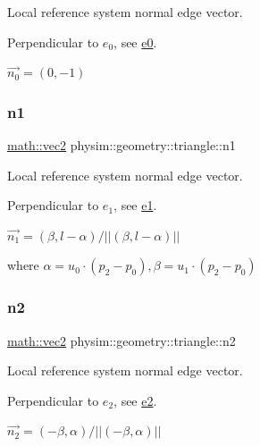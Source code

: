 Local reference system normal edge vector. 

Perpendicular to $e_0$, see \hyperlink{classphysim_1_1geometry_1_1triangle_a848982c72944fee96e266cae874b0553}{e0}.

$\vec{n_0} = (0,-1)$ \mbox{\label{classphysim_1_1geometry_1_1triangle_abebf947c1772ae8b3932a2c3e84597c6}} 
\subsubsection{\texorpdfstring{n1}{n1}}
{\footnotesize\ttfamily \hyperlink{structphysim_1_1math_1_1vec2}{math\+::vec2} physim\+::geometry\+::triangle\+::n1\hspace{0.3cm}{\ttfamily [private]}}



Local reference system normal edge vector. 

Perpendicular to $e_1$, see \hyperlink{classphysim_1_1geometry_1_1triangle_a1c94f05234361db97e282aaee2bda8f9}{e1}.

$\vec{n_1} = (\beta, l - \alpha)/ || (\beta, l - \alpha) || $

where $\alpha = u_0\cdot(p_2-p_0), \beta = u_1\cdot(p_2-p_0)$ \mbox{\label{classphysim_1_1geometry_1_1triangle_a18331f9216797cdb920b1dfb9d04b3d4}} 
\subsubsection{\texorpdfstring{n2}{n2}}
{\footnotesize\ttfamily \hyperlink{structphysim_1_1math_1_1vec2}{math\+::vec2} physim\+::geometry\+::triangle\+::n2\hspace{0.3cm}{\ttfamily [private]}}



Local reference system normal edge vector. 

Perpendicular to $e_2$, see \hyperlink{classphysim_1_1geometry_1_1triangle_a560a7684adbd40a8386e46767a759574}{e2}.

$\vec{n_2} = (-\beta, \alpha)/ || (-\beta, \alpha) || $

